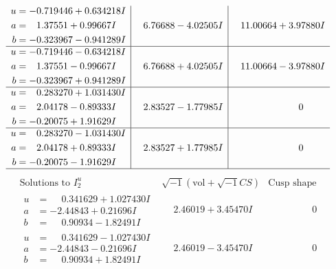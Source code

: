 \documentclass[1p]{elsarticle_modified}
\theoremstyle{definition}
\newcommand{\I}{\sqrt{-1}}
\begin{document}
$$\begin{array}{c|c|c}
\begin{aligned}
u &= -0.719446 + 0.634218 I \\
a &= \phantom{-}1.37551 + 0.99667 I \\
b &= -0.323967 - 0.941289 I\end{aligned}
 & \phantom{-}6.76688 - 4.02505 I & \phantom{-}11.00664 + 3.97880 I \\ \hline\begin{aligned}
u &= -0.719446 - 0.634218 I \\
a &= \phantom{-}1.37551 - 0.99667 I \\
b &= -0.323967 + 0.941289 I\end{aligned}
 & \phantom{-}6.76688 + 4.02505 I & \phantom{-}11.00664 - 3.97880 I \\ \hline\begin{aligned}
u &= \phantom{-}0.283270 + 1.031430 I \\
a &= \phantom{-}2.04178 - 0.89333 I \\
b &= -0.20075 + 1.91629 I\end{aligned}
 & \phantom{-}2.83527 - 1.77985 I & \phantom{-0.000000 } 0 \\ \hline\begin{aligned}
u &= \phantom{-}0.283270 - 1.031430 I \\
a &= \phantom{-}2.04178 + 0.89333 I \\
b &= -0.20075 - 1.91629 I\end{aligned}
 & \phantom{-}2.83527 + 1.77985 I & \phantom{-0.000000 } 0\\
 \hline 
 \end{array}$$\newpage$$\begin{array}{c|c|c}  
\text{Solutions to }I^u_{2}& \I (\text{vol} + \sqrt{-1}CS) & \text{Cusp shape}\\
 \hline 
\begin{aligned}
u &= \phantom{-}0.341629 + 1.027430 I \\
a &= -2.44843 + 0.21696 I \\
b &= \phantom{-}0.90934 - 1.82491 I\end{aligned}
 & \phantom{-}2.46019 + 3.45470 I & \phantom{-0.000000 } 0 \\ \hline\begin{aligned}
u &= \phantom{-}0.341629 - 1.027430 I \\
a &= -2.44843 - 0.21696 I \\
b &= \phantom{-}0.90934 + 1.82491 I\end{aligned}
 & \phantom{-}2.46019 - 3.45470 I & \phantom{-0.000000 } 0 \\ \hline\begin{aligned}

\end{aligned}
\end{array}$$
\end{document}
